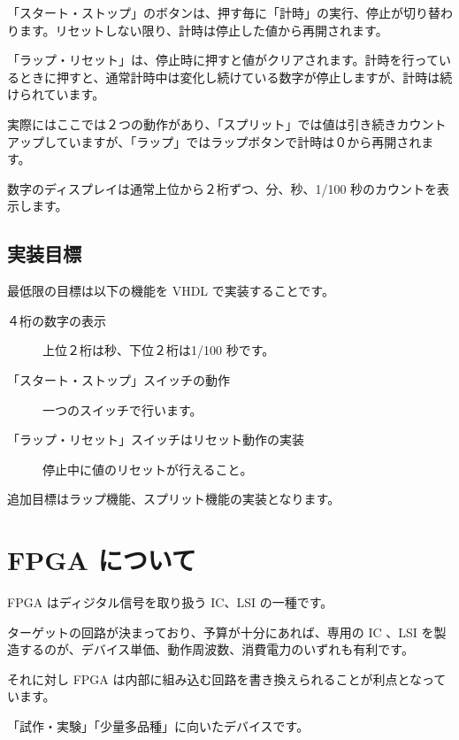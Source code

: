 \documentclass[letterpaper,10pt,dvipdfmx]{sphinxmanual}
\begin{document}
「スタート・ストップ」のボタンは、押す毎に「計時」の実行、停止が切り替わります。リセットしない限り、計時は停止した値から再開されます。

「ラップ・リセット」は、停止時に押すと値がクリアされます。計時を行っているときに押すと、通常計時中は変化し続けている数字が停止しますが、計時は続けられています。

実際にはここでは２つの動作があり、「スプリット」では値は引き続きカウントアップしていますが、「ラップ」ではラップボタンで計時は０から再開されます。

数字のディスプレイは通常上位から２桁ずつ、分、秒、1/100 秒のカウントを表示します。


\section{実装目標}
\label{\detokenize{02_stopwatch:id2}}
最低限の目標は以下の機能を VHDL で実装することです。
\begin{description}
\item[{４桁の数字の表示}] \leavevmode
上位２桁は秒、下位２桁は1/100 秒です。

\item[{「スタート・ストップ」スイッチの動作}] \leavevmode
一つのスイッチで行います。

\item[{「ラップ・リセット」スイッチはリセット動作の実装}] \leavevmode
停止中に値のリセットが行えること。

\end{description}

追加目標はラップ機能、スプリット機能の実装となります。


\chapter{FPGA について}
\label{\detokenize{03_fpga:fpga}}\label{\detokenize{03_fpga::doc}}
FPGA はディジタル信号を取り扱う IC、LSI の一種です。

ターゲットの回路が決まっており、予算が十分にあれば、専用の IC 、LSI を製造するのが、デバイス単価、動作周波数、消費電力のいずれも有利です。

それに対し FPGA は内部に組み込む回路を書き換えられることが利点となっています。

「試作・実験」「少量多品種」に向いたデバイスです。
\end{document}
